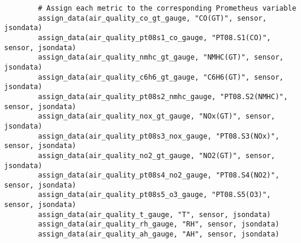 \begin{verbatim}
        # Assign each metric to the corresponding Prometheus variable
        assign_data(air_quality_co_gt_gauge, "CO(GT)", sensor, jsondata)
        assign_data(air_quality_pt08s1_co_gauge, "PT08.S1(CO)", sensor, jsondata)
        assign_data(air_quality_nmhc_gt_gauge, "NMHC(GT)", sensor, jsondata)
        assign_data(air_quality_c6h6_gt_gauge, "C6H6(GT)", sensor, jsondata)
        assign_data(air_quality_pt08s2_nmhc_gauge, "PT08.S2(NMHC)", sensor, jsondata)
        assign_data(air_quality_nox_gt_gauge, "NOx(GT)", sensor, jsondata)
        assign_data(air_quality_pt08s3_nox_gauge, "PT08.S3(NOx)", sensor, jsondata)
        assign_data(air_quality_no2_gt_gauge, "NO2(GT)", sensor, jsondata)
        assign_data(air_quality_pt08s4_no2_gauge, "PT08.S4(NO2)", sensor, jsondata)
        assign_data(air_quality_pt08s5_o3_gauge, "PT08.S5(O3)", sensor, jsondata)
        assign_data(air_quality_t_gauge, "T", sensor, jsondata)
        assign_data(air_quality_rh_gauge, "RH", sensor, jsondata)
        assign_data(air_quality_ah_gauge, "AH", sensor, jsondata)
\end{verbatim}

